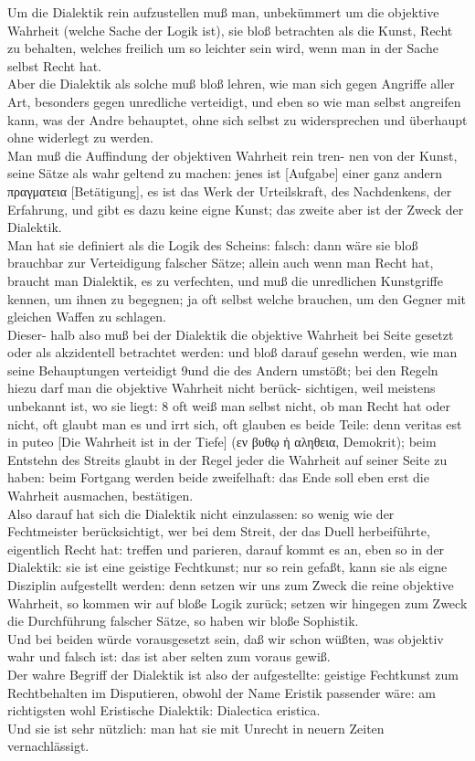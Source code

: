 \documentclass{book}
\newcommand{\de}[1]{{\color{red}#1}\\}
\begin{document}
\de{Um die Dialektik rein aufzustellen muß man,
unbekümmert um die objektive Wahrheit (welche
Sache der Logik ist), sie bloß betrachten als die
Kunst, Recht zu behalten, welches freilich um so
leichter sein wird, wenn man in der Sache selbst
Recht hat.}
\de{Aber die Dialektik als solche muß bloß
lehren, wie man sich gegen Angriffe aller Art,
besonders gegen unredliche verteidigt, und eben
so wie man selbst angreifen kann, was der Andre
behauptet, ohne sich selbst zu widersprechen und
überhaupt ohne widerlegt zu werden.}
\de{Man muß
die Auffindung der objektiven Wahrheit rein tren-
nen von der Kunst, seine Sätze als wahr geltend
zu machen: jenes ist [Aufgabe] einer ganz andern
\textgreek{πραγματεια} [Betätigung], es ist das Werk der
Urteilskraft, des Nachdenkens, der Erfahrung,
und gibt es dazu keine eigne Kunst; das zweite
aber ist der Zweck der Dialektik.}
\de{Man hat sie
definiert als die Logik des Scheins: falsch: dann
wäre sie bloß brauchbar zur Verteidigung falscher
Sätze; allein auch wenn man Recht hat, braucht
man Dialektik, es zu verfechten, und muß die
unredlichen Kunstgriffe kennen, um ihnen zu
begegnen; ja oft selbst welche brauchen, um den
Gegner mit gleichen Waffen zu schlagen.}
\de{Dieser-
halb also muß bei der Dialektik die objektive
Wahrheit bei Seite gesetzt oder als akzidentell
betrachtet werden: und bloß darauf gesehn
werden, wie man seine Behauptungen verteidigt
9und die des Andern umstößt; bei den Regeln hiezu
darf man die objektive Wahrheit nicht berück-
sichtigen, weil meistens unbekannt ist, wo sie
liegt: 8 oft weiß man selbst nicht, ob man Recht
hat oder nicht, oft glaubt man es und irrt sich, oft
glauben es beide Teile: denn veritas est in puteo
[Die Wahrheit ist in der Tiefe] (\textgreek{εν βυθῳ ἡ
αληθεια}, Demokrit); beim Entstehn des Streits
glaubt in der Regel jeder die Wahrheit auf seiner
Seite zu haben: beim Fortgang werden beide
zweifelhaft: das Ende soll eben erst die Wahrheit
ausmachen, bestätigen.}
\de{Also darauf hat sich die
Dialektik nicht einzulassen: so wenig wie der
Fechtmeister berücksichtigt, wer bei dem Streit,
der das Duell herbeiführte, eigentlich Recht hat:
treffen und parieren, darauf kommt es an, eben so
in der Dialektik: sie ist eine geistige Fechtkunst;
nur so rein gefaßt, kann sie als eigne Disziplin
aufgestellt werden: denn setzen wir uns zum
Zweck die reine objektive Wahrheit, so kommen
wir auf bloße Logik zurück; setzen wir hingegen
zum Zweck die Durchführung falscher Sätze, so
haben wir bloße Sophistik.}
\de{Und bei beiden würde
vorausgesetzt sein, daß wir schon wüßten, was
objektiv wahr und falsch ist: das ist aber selten
zum voraus gewiß.}
\de{Der wahre Begriff der Dialektik
ist also der aufgestellte: geistige Fechtkunst zum
Rechtbehalten im Disputieren, obwohl der Name
Eristik passender wäre: am richtigsten wohl
Eristische Dialektik: Dialectica eristica.}
\de{Und sie
ist sehr nützlich: man hat sie mit Unrecht in
neuern Zeiten vernachlässigt.}
\end{document}
